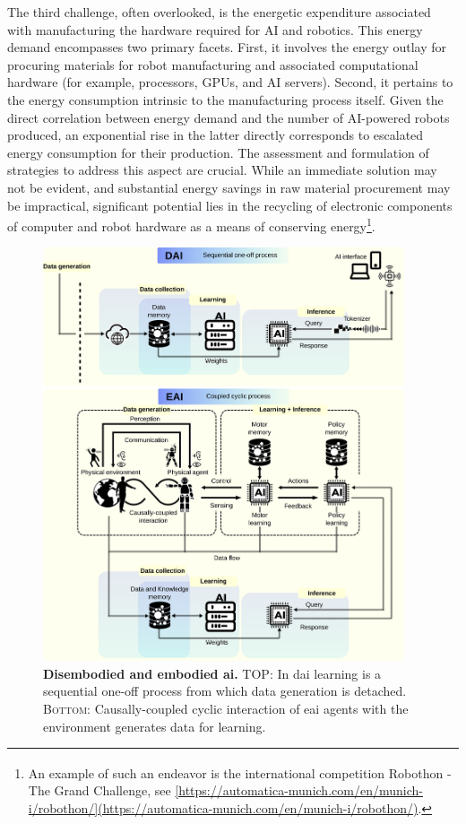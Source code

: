 \documentclass[12pt]{article}
\begin{document}
The third challenge, often overlooked, is the energetic expenditure associated with manufacturing the hardware required for AI and robotics. This energy demand encompasses two primary facets. First, it involves the energy outlay for procuring materials for robot manufacturing and associated computational hardware (for example, processors, GPUs, and AI servers). Second, it pertains to the energy consumption intrinsic to the manufacturing process itself. Given the direct correlation between energy demand and the number of AI-powered robots produced, an exponential rise in the latter directly corresponds to escalated energy consumption for their production. The assessment and formulation of strategies to address this aspect are crucial. While an immediate solution may not be evident, and substantial energy savings in raw material procurement may be impractical, significant potential lies in the recycling of electronic components of computer and robot hardware as a means of conserving energy\footnote{An example of such an endeavor is the international competition Robothon\textsuperscript{\textregistered} - The Grand Challenge, see \url{[https://automatica-munich.com/en/munich-i/robothon/](https://automatica-munich.com/en/munich-i/robothon/)}.}.

\begin{figure}[t!]
	\centering
	\hspace*{\fill}
	\includegraphics[width=0.95\textwidth]{eai_and_dai_concept_figure.png}
	\hspace*{\fill}
	\caption[] {\label{fig:eai_and_dai_concept_figure} \textbf{Disembodied and embodied \ac{ai}.} \textsc{TOP}: In \ac{dai} learning is a sequential one-off process from which data generation is  detached. \textsc{Bottom}: Causally-coupled cyclic interaction of \ac{eai} agents with the environment generates data for learning.}
	
\end{figure}
\end{document}
